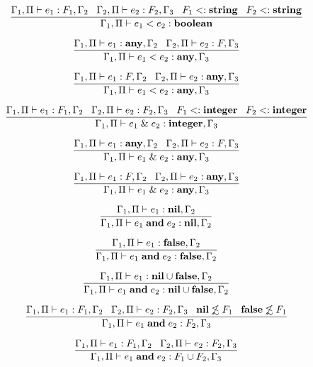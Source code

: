 \[
\dfrac{\Gamma_{1}, \Pi \vdash e_{1}:F_{1}, \Gamma_{2} \;\;\;
       \Gamma_{2}, \Pi \vdash e_{2}:F_{2}, \Gamma_{3} \;\;\;
       F_{1} <: \mathbf{string} \;\;\;
       F_{2} <: \mathbf{string}}
      {\Gamma_{1}, \Pi \vdash e_{1} < e_{2}:\mathbf{boolean}}
\]

\[
\dfrac{\Gamma_{1}, \Pi \vdash e_{1}:\mathbf{any}, \Gamma_{2} \;\;\;
       \Gamma_{2}, \Pi \vdash e_{2}:F, \Gamma_{3}}
      {\Gamma_{1}, \Pi \vdash e_{1} < e_{2}:\mathbf{any}, \Gamma_{3}}
\]

\[
\dfrac{\Gamma_{1}, \Pi \vdash e_{1}:F, \Gamma_{2} \;\;\;
       \Gamma_{2}, \Pi \vdash e_{2}:\mathbf{any}, \Gamma_{3}}
      {\Gamma_{1}, \Pi \vdash e_{1} < e_{2}:\mathbf{any}, \Gamma_{3}}
\]

\[
\dfrac{\Gamma_{1}, \Pi \vdash e_{1}:F_{1}, \Gamma_{2} \;\;\;
       \Gamma_{2}, \Pi \vdash e_{2}:F_{2}, \Gamma_{3} \;\;\;
       F_{1} <: \mathbf{integer} \;\;\;
       F_{2} <: \mathbf{integer}}
      {\Gamma_{1}, \Pi \vdash e_{1} \;\&\; e_{2}:\mathbf{integer}, \Gamma_{3}}
\]

\[
\dfrac{\Gamma_{1}, \Pi \vdash e_{1}:\mathbf{any}, \Gamma_{2} \;\;\;
       \Gamma_{2}, \Pi \vdash e_{2}:F, \Gamma_{3}}
      {\Gamma_{1}, \Pi \vdash e_{1} \;\&\; e_{2}:\mathbf{any}, \Gamma_{3}}
\]

\[
\dfrac{\Gamma_{1}, \Pi \vdash e_{1}:F, \Gamma_{2} \;\;\;
       \Gamma_{2}, \Pi \vdash e_{2}:\mathbf{any}, \Gamma_{3}}
      {\Gamma_{1}, \Pi \vdash e_{1} \;\&\; e_{2}:\mathbf{any}, \Gamma_{3}}
\]

\[
\dfrac{\Gamma_{1}, \Pi \vdash e_{1}:\mathbf{nil}, \Gamma_{2}}
      {\Gamma_{1}, \Pi \vdash e_{1} \; \mathbf{and} \; e_{2}:\mathbf{nil}, \Gamma_{2}}
\]

\[
\dfrac{\Gamma_{1}, \Pi \vdash e_{1}:\mathbf{false}, \Gamma_{2}}
      {\Gamma_{1}, \Pi \vdash e_{1} \; \mathbf{and} \; e_{2}:\mathbf{false}, \Gamma_{2}}
\]

\[
\dfrac{\Gamma_{1}, \Pi \vdash e_{1}:\mathbf{nil} \cup \mathbf{false}, \Gamma_{2}}
      {\Gamma_{1}, \Pi \vdash e_{1} \; \mathbf{and} \; e_{2}:\mathbf{nil} \cup \mathbf{false}, \Gamma_{2}}
\]

\[
\dfrac{\Gamma_{1}, \Pi \vdash e_{1}:F_{1}, \Gamma_{2} \;\;\;
       \Gamma_{2}, \Pi \vdash e_{2}:F_{2}, \Gamma_{3} \;\;\;
       \mathbf{nil} \not\lesssim F_{1} \;\;\;
       \mathbf{false} \not\lesssim F_{1}}
      {\Gamma_{1}, \Pi \vdash e_{1} \; \mathbf{and} \; e_{2}:F_{2}, \Gamma_{3}}
\]

\[
\dfrac{\Gamma_{1}, \Pi \vdash e_{1}:F_{1}, \Gamma_{2} \;\;\;
       \Gamma_{2}, \Pi \vdash e_{2}:F_{2}, \Gamma_{3}}
      {\Gamma_{1}, \Pi \vdash e_{1} \; \mathbf{and} \; e_{2}:F_{1} \cup F_{2}, \Gamma_{3}}
\]

